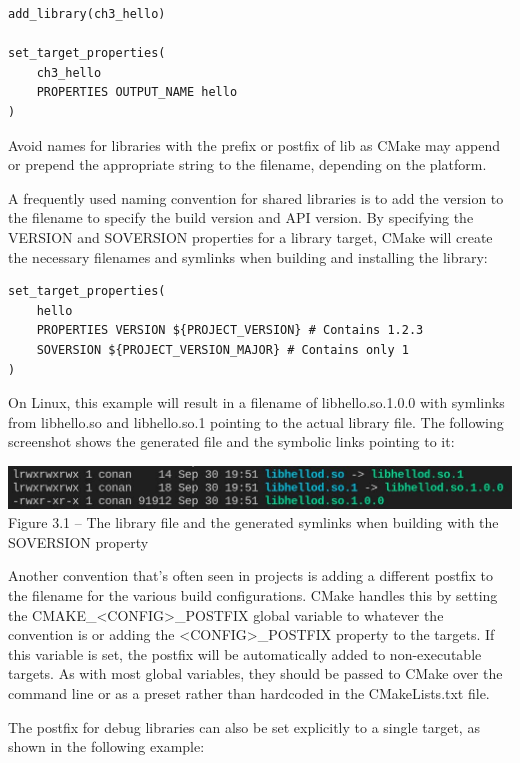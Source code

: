 \begin{lstlisting}[style=styleCMake]
add_library(ch3_hello)

set_target_properties(
	ch3_hello
	PROPERTIES OUTPUT_NAME hello
)
\end{lstlisting}

Avoid names for libraries with the prefix or postfix of lib as CMake may append or prepend the appropriate string to the filename, depending on the platform.

A frequently used naming convention for shared libraries is to add the version to the filename to specify the build version and API version. By specifying the VERSION and SOVERSION properties for a library target, CMake will create the necessary filenames and symlinks when building and installing the library:

\begin{lstlisting}[style=styleCMake]
set_target_properties(
	hello
	PROPERTIES VERSION ${PROJECT_VERSION} # Contains 1.2.3
	SOVERSION ${PROJECT_VERSION_MAJOR} # Contains only 1
)
\end{lstlisting}

On Linux, this example will result in a filename of libhello.so.1.0.0 with symlinks from libhello.so and libhello.so.1 pointing to the actual library file. The following screenshot shows the generated file and the symbolic links pointing to it:

\begin{center}
\includegraphics[width=1.\textwidth]{content/1/chapter3/images/1.jpg}\\
Figure 3.1 – The library file and the generated symlinks when building with the SOVERSION property
\end{center}

Another convention that's often seen in projects is adding a different postfix to the filename for the various build configurations. CMake handles this by setting the CMAKE\_<CONFIG>\_POSTFIX global variable to whatever the convention is or adding the <CONFIG>\_POSTFIX property to the targets. If this variable is set, the postfix will be automatically added to non-executable targets. As with most global variables, they should be passed to CMake over the command line or as a preset rather than hardcoded in the CMakeLists.txt file. 

The postfix for debug libraries can also be set explicitly to a single target, as shown in the following example:


